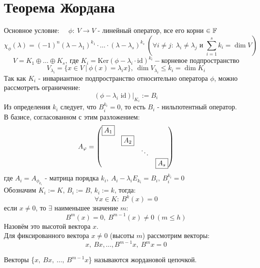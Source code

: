 \section{Теорема Жордана}
    Основное условие: \ \  $\phi: \ V \to V$ - линейный оператор, все его корни $\in \mathbb{F}$
    $$\chi_{\phi}(\lambda) = (-1)^n(\lambda-\lambda_1)^{k_1}\cdot\ldots\cdot(\lambda-\lambda_s)^{k_s} \ (\forall i\neq j: \ \lambda_i\neq\lambda_j \text{ и } \sum \limits_{i=1}^s k_i = \dim V)$$
    $$V = K_1\oplus\ldots\oplus K_s, \ \text{где } K_i = \text{Ker}(\phi-\lambda_i\cdot\text{id})^{k_i} - \text{корневое подпространство}$$
    $$V_{\lambda_i} = \{x\in V \ | \ \phi(x) = \lambda_ix\}, \  \dim V_{\lambda_i}\leqslant k_i = \dim K_i$$
    Так как $K_i$ - инвариантное подпространство относительно оператора $\phi$, можно рассмотреть ограничение: 
    $$(\phi-\lambda_i \text{ id})|_{K_i} := B_i$$
    Из определения $k_i$ следует, что $B_i^{k_i}=0$, то есть $B_i$ - нильпотентный оператор.\\
    В базисе, согласованном с этим разложением: 
    $$A_{\phi} = \begin{pmatrix}
    \text{\fbox{$A_1$}}\\
    \null & \text{\fbox{$A_2$}}\\
    \null & \null & \ddots\\
    \null & \null & \null & \text{\fbox{$A_s$}}
    \end{pmatrix}$$
    где $A_i = A_{\phi_{k_i}}$ - матрица порядка $k_i, \  A_i-\lambda_iE_{k_i} = B_i, \ B_i^{k_i}=0$\\
    Обозначим $K_i :=K$, $B_i :=B$, $k_i :=k$, тогда: 
    $$\forall x\in K: \  B^k(x) = 0$$
    если $x\neq0$, то $\exists$ наименьшее значение $m$: 
    $$B^m(x) = 0, \ B^{m-1}(x)\neq 0 \ (m\leqslant h)$$ 
    Назовём это высотой вектора $x$.\\
    Для фиксированного вектора $x\neq0$ (высоты $m$) рассмотрим векторы: 
    $$x, \  Bx, \ldots,B^{m-1}x, \ B^mx = 0$$
    \begin{definition}
        Векторы \{$x,\ Bx,\ \ldots,\  B^{m-1}x $\} называются жордановой цепочкой.
    \end{definition}  
